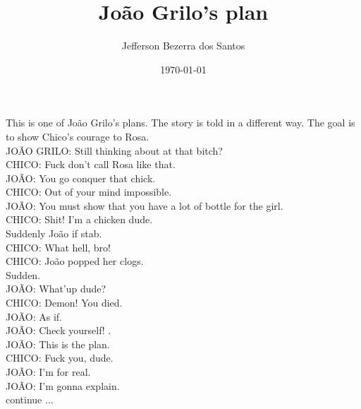 \documentclass[a4paper,11pt]{article}
\date{\today}
\title{Jo\~ao Grilo's plan}
\author{Jefferson Bezerra dos Santos}
\begin{document}
\maketitle
This is one of Jo\~ao Grilo's plans. The story is told in a different way.
The goal is to show Chico's courage to Rosa. \\

\noindent
JO\~AO GRILO: Still thinking about at that bitch? \\
CHICO: Fuck  don't call Rosa like that. \\
JO\~AO: You go conquer that chick. \\
CHICO: Out of your mind impossible. \\
JO\~AO: You must show that you have a lot of bottle for the girl. \\
CHICO: Shit! I'm a chicken dude. \\

\noindent
Suddenly Jo\~ao if stab. \\
CHICO: What hell, bro! \\
CHICO: Jo\~ao popped her clogs.\\

\noindent
Sudden. \\
JO\~AO: What'up dude?\\
CHICO: Demon! You died. \\ 
JO\~AO: As if. \\
JO\~AO: Check yourself! .\\
JO\~AO: This is the plan. \\
CHICO: Fuck you, dude. \\
JO\~AO: I'm for real.\\
JO\~AO: I'm gonna explain. \\

\noindent
continue ...
\end{document}
